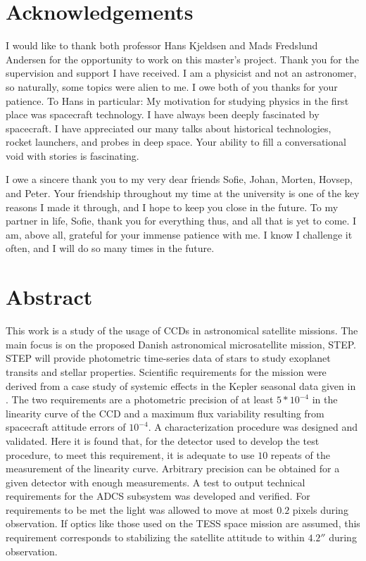 \documentclass[../main.tex]{subfiles}
\begin{document}
	\thispagestyle{empty}
	\chapter*{Acknowledgements}
	I would like to thank both professor Hans Kjeldsen and Mads Fredslund Andersen for the opportunity to work on this master's project. Thank you for the supervision and support I have received. I am a physicist and not an astronomer, so naturally, some topics were alien to me. I owe both of you thanks for your patience.
	To Hans in particular: My motivation for studying physics in the first place was spacecraft technology. I have always been deeply fascinated by spacecraft. I have appreciated our many talks about historical technologies, rocket launchers, and probes in deep space. Your ability to fill a conversational void with stories is fascinating. 
	
	I owe a sincere thank you to my very dear friends Sofie, Johan, Morten, Hovsep, and Peter. Your friendship throughout my time at the university is one of the key reasons I made it through, and I hope to keep you close in the future. To my partner in life, Sofie, thank you for everything thus, and all that is yet to come. I am, above all, grateful for your immense patience with me. I know I challenge it often, and I will do so many times in the future. 
	
	\clearpage
	\thispagestyle{empty}
	\mbox{}
	\clearpage
	\thispagestyle{empty}
	\chapter*{Abstract}
	This work is a study of the usage of CCDs in astronomical satellite missions. The main focus is on the proposed Danish astronomical microsatellite mission, STEP. STEP will provide photometric time-series data of stars to study exoplanet transits and stellar properties. Scientific requirements for the mission were derived from a case study of systemic effects in the Kepler seasonal data given in \cite{hatp7}. The two requirements are a photometric precision of at least  $5*10^{-4}$ in the linearity curve of the CCD and a maximum flux variability resulting from spacecraft attitude errors of $10^{-4}$. A characterization procedure was designed and validated. Here it is found that, for the detector used to develop the test procedure, to meet this requirement, it is adequate to use $10$ repeats of the measurement of the linearity curve. Arbitrary precision can be obtained for a given detector with enough measurements. A test to output technical requirements for the ADCS subsystem was developed and verified. For requirements to be met the light was allowed to move at most $ 0.2 $ pixels during observation. If optics like those used on the TESS space mission are assumed, this requirement corresponds to stabilizing the satellite attitude to within $4.2''$ during observation. 
	
\end{document}
